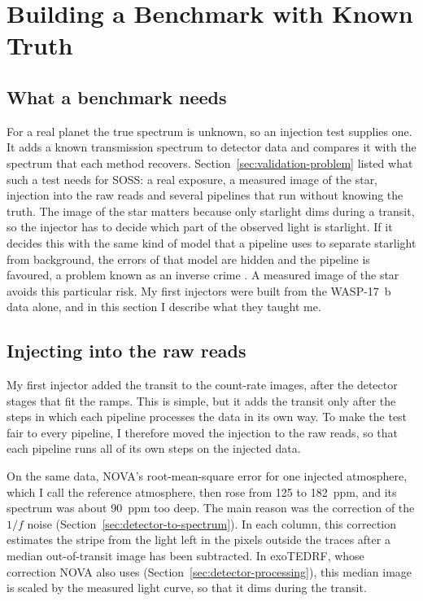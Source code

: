 \section{Building a Benchmark with Known Truth}
\label{sec:benchmark}

\subsection{What a benchmark needs}
\label{sec:benchmark-needs}

For a real planet the true spectrum is unknown, so an injection test supplies
one. It adds a known transmission spectrum to detector data and compares it
with the spectrum that each method recovers.
Section~\ref{sec:validation-problem} listed what such a test needs for SOSS: a
real exposure, a measured image of the star, injection into the raw reads
and several pipelines that run without knowing the truth. The image of the star matters because only starlight dims during a
transit, so the injector has to decide which part of the observed light is
starlight. If it decides this with the same kind of model that a pipeline uses
to separate starlight from background, the errors of that model are hidden and
the pipeline is favoured, a problem known as an inverse crime
\citep{KaipioSomersalo2007}. A measured image of the star avoids this
particular risk. My first
injectors were built from the WASP-17~b data alone, and in this section I describe
what they taught me.

\subsection{Injecting into the raw reads}
\label{sec:raw-injection}

My first injector added the transit to the count-rate images, after the
detector stages that fit the ramps. This is simple, but it adds the transit
only after the steps in which each pipeline processes the data in its own
way. To make the test fair to every pipeline, I therefore moved the injection
to the raw reads, so that each pipeline runs all of its own steps on the
injected data.

On the same data, NOVA's root-mean-square error for one injected atmosphere, which I call the reference atmosphere,
then rose from 125 to 182~ppm, and its spectrum was about 90~ppm too deep. The main reason was the correction of the $1/f$ noise
(Section~\ref{sec:detector-to-spectrum}). In each column, this correction
estimates the stripe from the light left in the pixels outside the traces
after a median out-of-transit image has been subtracted. In exoTEDRF, whose
correction NOVA also uses (Section~\ref{sec:detector-processing}), this
median image is scaled by the measured light curve, so that it dims during the
transit.

